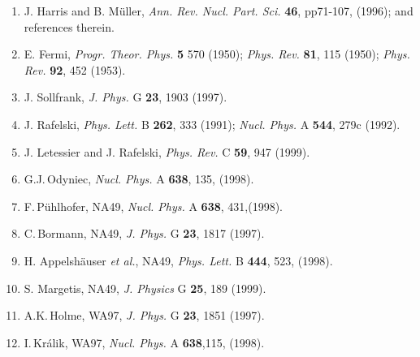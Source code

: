 \begin{mdframed}[linecolor=gray,roundcorner=12pt,backgroundcolor=Dandelion!15,linewidth=1pt,leftmargin=0cm,rightmargin=0cm,topline=true,bottomline=true,skipabove=12pt]
{\begin{enumerate}
\item%
J. Harris and B. M\"uller, {\it Ann. Rev. Nucl. Part. Sci.}
{\bf 46}, pp71-107, (1996); and references therein.

\item%
E. Fermi, {\it Progr. Theor. Phys.} {\bf 5} 570 (1950);
{\it Phys. Rev.} {\bf 81}, 115 (1950);
{\it Phys. Rev.} {\bf 92}, 452 (1953).


\item%
J. Sollfrank, {\it J. Phys. } G {\bf 23}, 1903 (1997).

\item%
J. Rafelski, {\it Phys. Lett. }B {\bf 262}, 333 (1991);
{\it Nucl. Phys.} A {\bf 544}, 279c (1992).


\item%
J. Letessier and J. Rafelski, {\it Phys. Rev.} C {\bf 59}, 947 (1999).

\item%
G.J.\,Odyniec, {\it Nucl. Phys.} A {\bf 638}, 135, (1998).

\item%
F.\,P\"uhlhofer, NA49, 
{\it Nucl. Phys.} A {\bf 638}, 431,(1998).

\item%
C.\,Bormann, NA49, 
{\it J. Phys.} G {\bf 23}, 1817 (1997).

\item%
H. Appelsh\"auser {\it et al.}, NA49,
{\it Phys. Lett.} B {\bf 444}, 523, (1998).

\item%
S. Margetis, NA49,
{\it J. Physics} G {\bf 25}, 189 (1999).

\item%
A.K.\,Holme, WA97, {\it J. Phys.} G {\bf 23}, 1851 (1997).

\item%
I.\,Kr\'alik, WA97, 
{\it Nucl. Phys.} A {\bf 638},115, (1998).


\end{enumerate}}
\end{mdframed}
